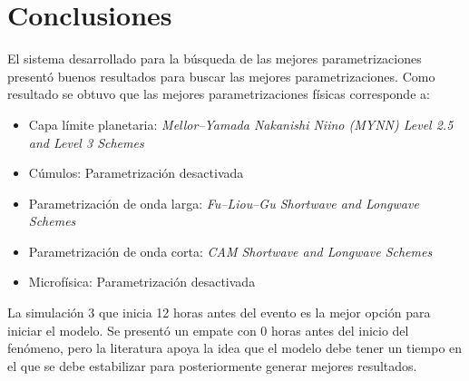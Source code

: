 \section{Conclusiones}

El sistema desarrollado para la búsqueda de las mejores parametrizaciones presentó buenos resultados para buscar las mejores parametrizaciones. Como resultado se obtuvo que las mejores parametrizaciones físicas corresponde a:

\begin{itemize}
    \item Capa límite planetaria: \textit{Mellor–Yamada Nakanishi Niino (MYNN) Level 2.5 and Level 3 Schemes}
    \item Cúmulos: Parametrización desactivada
    \item Parametrización de onda larga: \textit{Fu–Liou–Gu Shortwave and Longwave Schemes}
    \item Parametrización de onda corta: \textit{CAM Shortwave and Longwave Schemes}
    \item Microfísica: Parametrización desactivada
\end{itemize}

La simulación 3 que inicia 12 horas antes del evento es la mejor opción para iniciar el modelo. Se presentó un empate con 0 horas antes del inicio del fenómeno, pero la literatura apoya la idea que el modelo debe tener un tiempo en el que se debe estabilizar para posteriormente generar mejores resultados.

